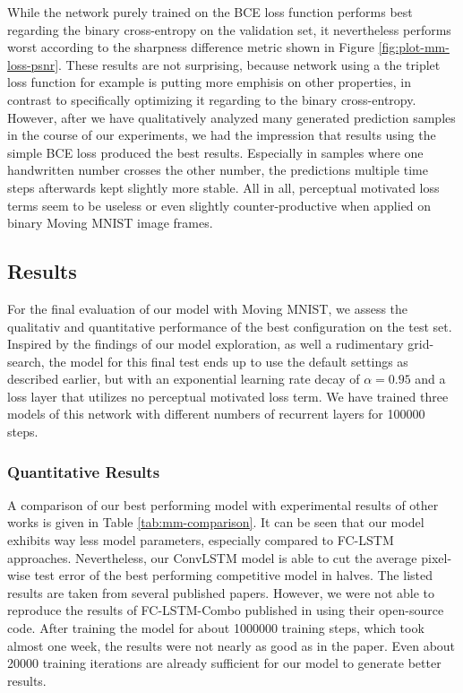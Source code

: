 While the network purely trained on the BCE loss function performs best regarding the binary cross-entropy on the validation set, it nevertheless performs worst according to the sharpness difference metric shown in Figure \ref{fig:plot-mm-loss-psnr}. These results are not surprising, because network using a the triplet loss function for example is putting more emphisis on other properties, in contrast to specifically optimizing it regarding to the binary cross-entropy. However, after we have qualitatively analyzed many generated prediction samples in the course of our experiments, we had the impression that results using the simple BCE loss produced the best results. Especially in samples where one handwritten number crosses the other number, the predictions multiple time steps afterwards kept slightly more stable. All in all, perceptual motivated loss terms seem to be useless or even slightly counter-productive when applied on binary Moving MNIST image frames. 

\subsection{Results}

For the final evaluation of our model with Moving MNIST, we assess the qualitativ and quantitative performance of the best configuration on the test set. Inspired by the findings of our model exploration, as well a rudimentary grid-search, the model for this final test ends up to use the default settings as described earlier, but with an exponential learning rate decay of $\alpha=0.95$ and a loss layer that utilizes no perceptual motivated loss term. We have trained three models of this network with different numbers of recurrent layers for \num{100000} steps.


\subsubsection{Quantitative Results}

A comparison of our best performing model with experimental results of other works is given in Table \ref{tab:mm-comparison}. It can be seen that our model exhibits way less model parameters, especially compared to FC-LSTM approaches. Nevertheless, our ConvLSTM model is able to cut the average pixel-wise test error of the best performing competitive model in halves. The listed results are taken from several published papers. However, we were not able to reproduce the results of FC-LSTM-Combo published in \parencite{unsup_learn_lstm} using their open-source code. After training the model for about \num{1000000} training steps, which took almost one week, the results were not nearly as good as in the paper. Even about \num{20000} training iterations are already sufficient for our model to generate better results.

